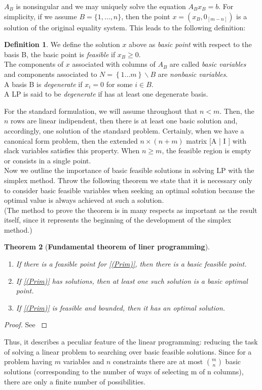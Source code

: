 \documentclass[a4paper,10 pt,titlepage,twoside]{book}
\theoremstyle{plain}
\newtheorem{thm}{Theorem}[chapter]
\theoremstyle{definition}
\newtheorem{defn}[thm]{Definition}
\theoremstyle{remark}
\begin{document}
$A_{B}$ is nonsingular and we may uniquely solve the equation $A_{B}x_{B} = b$. For simplicity, if we assume $B = \{1, \dots, n\}$, then the point $x =\left(x_{B},0_{[m-n]}\right)$ is a solution of the original equality system. This leads to the following definition:
\begin{defn}

	We define the solution $x$ above as \textit{basic point} with respect to the basis B, the basic point is \textit{feasible} if $x_{B}\geq 0$. \\The components of $x$ associated with columns of $A_{B}$ are called \textit{basic variables} and components associated to $N  = \left\lbrace 1...m\right\rbrace  \backslash B$ are \textit{nonbasic variables}.\\
	A basis B is \textit{degenerate} if $x_{i}= 0$ for some $i\in B$.\\
	A LP is said to be \textit{degenerate} if has at least one degenerate basis.
\end{defn}
For the standard formulation, we will assume throughout that $n < m$.
Then, the $n$ rows are linear indipendent, then there is at least one basic solution and, accordingly, one solution of the standard problem. Certainly, when we have a canonical form problem, then the extended $n \times (n+m)$ matrix [A | I ] with slack variables satisfies this property. When $n \geq m$, the feasible region is empty or consists in a single point.\\
Now we outline the importance of basic feasible solutions in solving LP with the simplex method.
Throw the following theorem we state that it is necessary only to consider basic feasible
variables when seeking an optimal solution because the optimal
value is always achieved at such a solution.\\ (The method to prove the theorem is in many respects as important as the result itself, since it represents the beginning of the development of the simplex
method.)
\begin{thm}[\textbf{Fundamental theorem of liner programming}] \ \\
\begin{enumerate}
\item If there is a feasible point for \ref{(Prim)}, then there is a basic feasible point.
\item If \ref{(Prim)} has solutions, then at least one such solution is a basic optimal point.
\item If \ref{(Prim)} is feasible and bounded, then it has an optimal solution.
\end{enumerate}
\end{thm}
\begin{proof}
	See \cite{LP}
\end{proof}
Thus, it describes a peculiar feature of the linear programming: reducing the task of solving a linear problem to searching over basic feasible solutions. Since for a problem having $m$ variables and $n$ constraints there are at most ${m}\choose{n}$ basic solutions (corresponding to the number of ways of selecting m of n columns), there are only a finite number of possibilities. 
\end{document}
